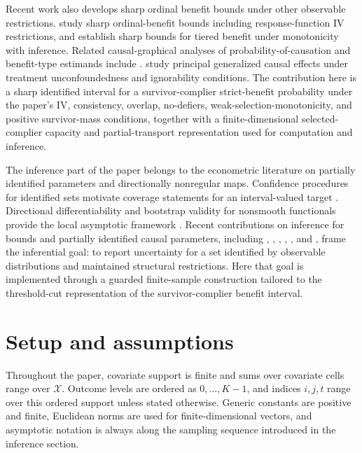 \documentclass[11pt]{article}
\begin{document}
Recent work also develops sharp ordinal benefit bounds under other observable restrictions. \citet{GabrielSachsJensen2024} study sharp ordinal-benefit bounds including response-function IV restrictions, and \citet{deAguasEtAl2025} establish sharp bounds for tiered benefit under monotonicity with inference. Related causal-graphical analyses of probability-of-causation and benefit-type estimands include \citet{TianPearl2000,SachsEtAl2023,DuarteEtAl2023}. \citet{ChenLi2026} study principal generalized causal effects under treatment unconfoundedness and ignorability conditions. The contribution here is a sharp identified interval for a survivor-complier strict-benefit probability under the paper's IV, consistency, overlap, no-defiers, weak-selection-monotonicity, and positive survivor-mass conditions, together with a finite-dimensional selected-complier capacity and partial-transport representation used for computation and inference.

The inference part of the paper belongs to the econometric literature on partially identified parameters and directionally nonregular maps. Confidence procedures for identified sets motivate coverage statements for an interval-valued target \citep{ImbensManski2004,ChernozhukovHongTamer2007,RomanoShaikh2010,Tamer2010,Molinari2020,ChernozhukovLeeRosen2013}. Directional differentiability and bootstrap validity for nonsmooth functionals provide the local asymptotic framework \citep{vanDerVaart1998,FangSantos2019,HongLi2018}. Recent contributions on inference for bounds and partially identified causal parameters, including \citet{Russell2021}, \citet{LevisEtAl2025}, \citet{BenMichael2025}, \citet{KhandamiryanSemenova2026}, \citet{Noack2026}, and \citet{LeeLiu2024}, frame the inferential goal: to report uncertainty for a set identified by observable distributions and maintained structural restrictions. Here that goal is implemented through a guarded finite-sample construction tailored to the threshold-cut representation of the survivor-complier benefit interval.


\section{Setup and assumptions}\label{sec:setup}

Throughout the paper, covariate support is finite and sums over covariate cells range over \(\mathcal X\). Outcome levels are ordered as \(0,\ldots,K-1\), and indices \(i,j,t\) range over this ordered support unless stated otherwise. Generic constants are positive and finite, Euclidean norms are used for finite-dimensional vectors, and asymptotic notation is always along the sampling sequence introduced in the inference section.
\end{document}
